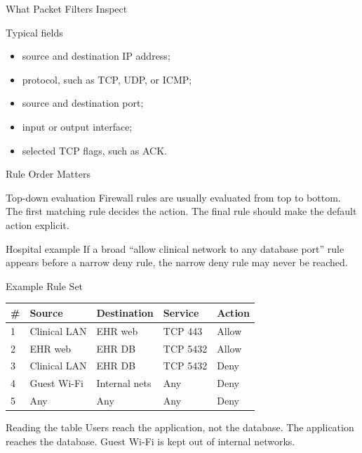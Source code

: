 \documentclass[presentation]{beamer}
\begin{document}
\begin{frame}[c]{What Packet Filters Inspect}
\begin{block}{Typical fields}
\begin{itemize}
    \item source and destination IP address;
    \item protocol, such as TCP, UDP, or ICMP;
    \item source and destination port;
    \item input or output interface;
    \item selected TCP flags, such as ACK.
\end{itemize}
\end{block}
\end{frame}

\begin{frame}[c]{Rule Order Matters}
\begin{block}{Top-down evaluation}
Firewall rules are usually evaluated from top to bottom. The first matching rule decides the action.
The final rule should make the default action explicit.
\end{block}

\begin{exampleblock}{Hospital example}
If a broad ``allow clinical network to any database port'' rule appears before a narrow deny rule,
the narrow deny rule may never be reached.
\end{exampleblock}
\end{frame}

\begin{frame}[c]{Example Rule Set}
\small
\begin{tabularx}{\textwidth}{@{}p{}p{}p{}p{}X@{}}
\toprule
\textbf{\#} & \textbf{Source} & \textbf{Destination} & \textbf{Service} & \textbf{Action} \\
\midrule
1 & Clinical LAN & EHR web & TCP 443 & Allow \\
2 & EHR web & EHR DB & TCP 5432 & Allow \\
3 & Clinical LAN & EHR DB & TCP 5432 & Deny \\
4 & Guest Wi-Fi & Internal nets & Any & Deny \\
5 & Any & Any & Any & Deny \\
\bottomrule
\end{tabularx}

\begin{block}{Reading the table}
Users reach the application, not the database. The application reaches the database. Guest Wi-Fi is
kept out of internal networks.
\end{block}
\end{frame}
\end{document}
